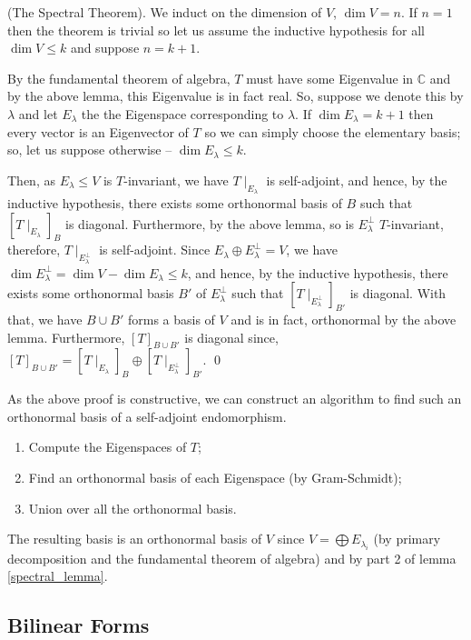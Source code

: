 \documentclass[
]{article}
\theoremstyle{definition}
\theoremstyle{definition}
\begin{document}
\proof (The Spectral Theorem). We induct on the dimension of \(V\),
\(\dim V = n\). If \(n = 1\) then the theorem is trivial so let us
assume the inductive hypothesis for all \(\dim V \le k\) and suppose
\(n = k + 1\).

By the fundamental theorem of algebra, \(T\) must have some Eigenvalue
in \(\mathbb{C}\) and by the above lemma, this Eigenvalue is in fact
real. So, suppose we denote this by \(\lambda\) and let \(E_\lambda\)
the the Eigenspace corresponding to \(\lambda\). If
\(\dim E_\lambda = k + 1\) then every vector is an Eigenvector of \(T\)
so we can simply choose the elementary basis; so, let us suppose
otherwise -- \(\dim E_\lambda \le k\).

Then, as \(E_\lambda \le V\) is \(T\)-invariant, we have
\(T \mid_{E_\lambda}\) is self-adjoint, and hence, by the inductive
hypothesis, there exists some orthonormal basis of \(B\) such that
\([T \mid_{E_\lambda}]_B\) is diagonal. Furthermore, by the above lemma,
so is \(E_\lambda^\bot\) \(T\)-invariant, therefore,
\(T \mid_{E_\lambda^\bot}\) is self-adjoint. Since
\(E_\lambda \oplus E_\lambda^\bot = V\), we have
\(\dim E_\lambda^\bot = \dim V - \dim E_\lambda \le k\), and hence, by
the inductive hypothesis, there exists some orthonormal basis \(B'\) of
\(E_\lambda^\bot\) such that \([T \mid_{E_\lambda^\bot}]_{B'}\) is
diagonal. With that, we have \(B \cup B'\) forms a basis of \(V\) and is
in fact, orthonormal by the above lemma. Furthermore,
\([T]_{B \cup B'}\) is diagonal since,
\([T]_{B \cup B'} = [T \mid_{E_\lambda}]_B \oplus [T \mid_{E_\lambda^\bot}]_{B'}\).
\qed

As the above proof is constructive, we can construct an algorithm to
find such an orthonormal basis of a self-adjoint endomorphism.

\begin{enumerate}
  \item Compute the Eigenspaces of \(T\);
  \item Find an orthonormal basis of each Eigenspace (by Gram-Schmidt);
  \item Union over all the orthonormal basis.
\end{enumerate}

The resulting basis is an orthonormal basis of \(V\) since
\(V = \bigoplus E_{\lambda_i}\) (by primary decomposition and the
fundamental theorem of algebra) and by part 2 of lemma
\ref{spectral_lemma}.

\hypertarget{bilinear-forms}{%
\subsection{Bilinear Forms}\label{bilinear-forms}}
\end{document}
